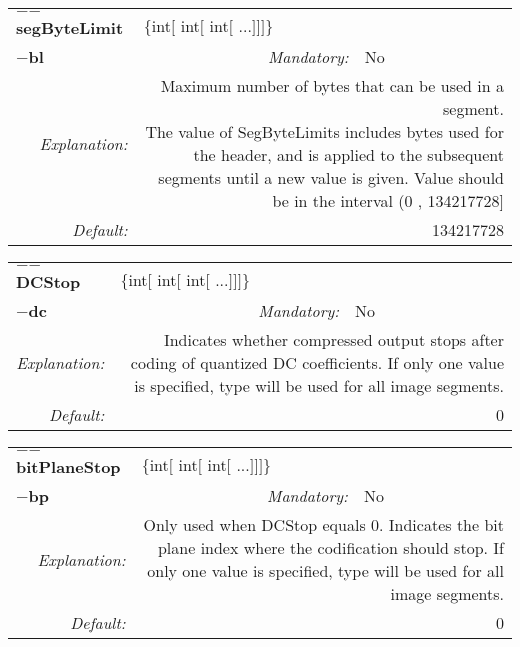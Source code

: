 \begin{center}\begin{tabular}{|rr|rlrl|}
\hline
\multicolumn{2}{|l|}{\textbf{$-$$-$segByteLimit}} & \multicolumn{4}{|l|}{$\{$int$[$ int$[$ int$[$ ...$]$$]$$]$$\}$} \\
\cline{3-6}
\multicolumn{2}{|l|}{\textbf{$-$bl}} & \emph{Mandatory:} & No & &  \\
\hline
\emph{Explanation:} & \multicolumn{5}{|p{12cm}|}{Maximum number of bytes that can be used in a segment.\newline The value of SegByteLimits includes bytes used for the header, and is applied to the subsequent segments until a new value is given. Value should be in the interval (0 , 134217728]} \\
\hline
\emph{Default:} & \multicolumn{5}{|p{12cm}|}{134217728 } \\
\hline
\end{tabular}\end{center}
\begin{center}\begin{tabular}{|rr|rlrl|}
\hline
\multicolumn{2}{|l|}{\textbf{$-$$-$DCStop}} & \multicolumn{4}{|l|}{$\{$int$[$ int$[$ int$[$ ...$]$$]$$]$$\}$} \\
\cline{3-6}
\multicolumn{2}{|l|}{\textbf{$-$dc}} & \emph{Mandatory:} & No & &  \\
\hline
\emph{Explanation:} & \multicolumn{5}{|p{12cm}|}{Indicates whether compressed output stops after coding of quantized DC coefficients.  If only one value is specified, type will be used for all image segments.} \\
\hline
\emph{Default:} & \multicolumn{5}{|p{12cm}|}{0 } \\
\hline
\end{tabular}\end{center}
\begin{center}\begin{tabular}{|rr|rlrl|}
\hline
\multicolumn{2}{|l|}{\textbf{$-$$-$bitPlaneStop}} & \multicolumn{4}{|l|}{$\{$int$[$ int$[$ int$[$ ...$]$$]$$]$$\}$} \\
\cline{3-6}
\multicolumn{2}{|l|}{\textbf{$-$bp}} & \emph{Mandatory:} & No & &  \\
\hline
\emph{Explanation:} & \multicolumn{5}{|p{12cm}|}{Only used when DCStop equals 0. Indicates the bit plane index where the codification should stop.  If only one value is specified, type will be used for all image segments.} \\
\hline
\emph{Default:} & \multicolumn{5}{|p{12cm}|}{0 } \\
\hline
\end{tabular}\end{center}
